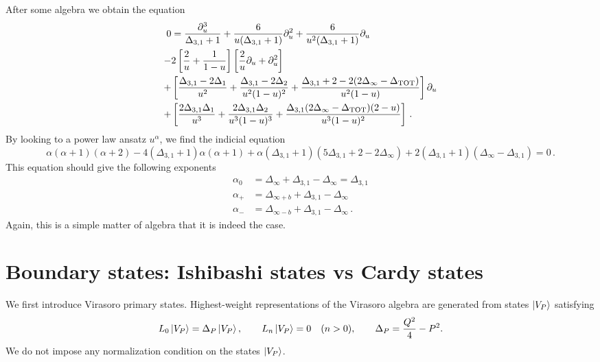 \documentclass[a4paper]{article}
\begin{document}
After some algebra we obtain the equation
\begin{equation}
  \begin{aligned}
    0 &= \frac{\partial_u^3}{\Delta_{3,1}+1} + \frac{6}{u(\Delta_{3,1}+1)}\partial_u^2 +\frac{6}{u^2(\Delta_{3,1}+1)}\partial_u\\
    -&2\left[\frac{2}{u}+\frac{1}{1-u}\right]\left[\frac{2}{u}\partial_u +\partial_u^2\right] \\
    +&\left[\frac{\Delta_{3,1}-2\Delta_1}{u^2}+\frac{\Delta_{3,1}-2\Delta_2}{u^2(1-u)^2}+\frac{\Delta_{3,1}+2-2(2\Delta_{\infty}-\Delta_{\rm TOT})}{u^2(1-u)}\right]\partial_u\\
    +&\left[\frac{2\Delta_{3,1}\Delta_1}{u^3}+\frac{2\Delta_{3,1}\Delta_2}{u^3(1-u)^3}+\frac{\Delta_{3,1}(2\Delta_{\infty}-\Delta_{\rm TOT})(2-u)}{u^3(1-u)^2}\right]\,.
  \end{aligned}
\end{equation}
By looking to a power law ansatz $u^{\alpha}$, we find the indicial equation
\begin{equation}
  \alpha(\alpha+1)(\alpha+2)-4(\Delta_{3,1}+1)\alpha(\alpha+1)+\alpha(\Delta_{3,1}+1)(5\Delta_{3,1}+2 -2\Delta_{\infty})+2(\Delta_{3,1}+1)(\Delta_{\infty}-\Delta_{3,1}) =0\,.
\end{equation}
This equation should give the following exponents
\begin{equation}
  \begin{aligned}
    \alpha_{0} &= \Delta_{\infty} + \Delta_{3,1} - \Delta_{\infty} = \Delta_{3,1}\\
    \alpha_{+} &=  \Delta_{\infty +b} + \Delta_{3,1} - \Delta_{\infty} \\
    \alpha_{-} &=  \Delta_{\infty -b} + \Delta_{3,1} - \Delta_{\infty}\,.
  \end{aligned}
\end{equation}
Again, this is a simple matter of algebra that it is indeed the case.
\section{Boundary states: Ishibashi states vs Cardy states}
We first introduce Virasoro primary states. Highest-weight representations of the Virasoro algebra are generated from states $\ket{V_P}$ satisfying
\begin{equation}
  L_0 \ket{V_P} = \Delta_P \ket{V_P}, 
  \qquad 
  L_n \ket{V_P} = 0 \quad (n>0),
  \qquad 
  \Delta_P = \frac{Q^2}{4}-P^2 .
\end{equation}
We do not impose any normalization condition on the states $\ket{V_P}$.
\end{document}

